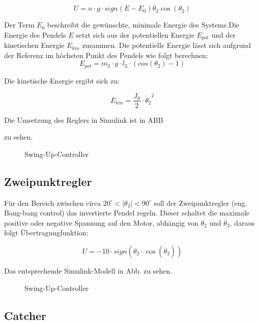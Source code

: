 \begin{equation}
U = n \cdot g \cdot sign(E-E_0)\dot{\theta}_2\cos(\theta_2)
\end{equation}

Der Term $E_0$ beschreibt die gewünschte, minimale Energie des Systems.Die Energie des Pendels $E$ setzt sich aus der potentiellen Energie $E_{pot}$ und der kinetischen Energie $E_{kin}$ zusammen. Die potentielle Energie lässt sich aufgrund der Referenz im höchsten Punkt des Pendels wie folgt berechnen:
\begin{equation}
E_{pot} = m_2 \cdot g \cdot l_2 \cdot (cos(\theta_2)-1)
\end{equation}

Die kinetische Energie ergibt sich zu:

\begin{equation}
E_{kin} = \frac{J_0}{2} \cdot \dot{\theta_2}^2
\end{equation}

Die Umsetzung des Reglers in Simulink ist in ABB %

zu sehen. 

\begin{figure}[h!]
  \caption{Swing-Up-Controller}
  \centering
\end{figure}


\subsection{Zweipunktregler}
\label{zweipunktregler} 

Für den Bereich zwischen circa $20^\circ < \left| \theta_2 \right| < 90^\circ$ soll der Zweipunktregler (eng. Bang-bang control) das invertierte Pendel regeln. Dieser schaltet die maximale positive oder negative Spannung auf den Motor, abhängig von $ \theta_2 $ und $ \dot{\theta_2} $, daraus folgt  Übertragungfunktion:

\begin{equation}
U = -10 \cdot sign(\theta_2 \cdot \cos(\dot{\theta}_2))
\end{equation}

  Das entsprechende Simulink-Modell in Abb. %
zu sehen. 

\begin{figure}[h!]
  \caption{Swing-Up-Controller}
  \centering
\end{figure}

\subsection{Catcher}
\label{catcher} 

